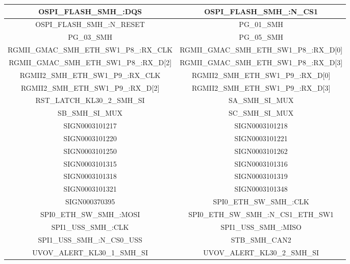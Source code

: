 \begin{center}
\begin{longtable}{|c|c|}
    OSPI\_FLASH\_SMH\_:DQS & OSPI\_FLASH\_SMH\_:N\_CS1 \\ \hline 
    OSPI\_FLASH\_SMH\_:N\_RESET & PG\_01\_SMH \\ \hline 
    PG\_03\_SMH & PG\_05\_SMH \\ \hline 
    RGMII\_GMAC\_SMH\_ETH\_SW1\_P8\_:RX\_CLK & RGMII\_GMAC\_SMH\_ETH\_SW1\_P8\_:RX\_D[0] \\ \hline 
    RGMII\_GMAC\_SMH\_ETH\_SW1\_P8\_:RX\_D[2] & RGMII\_GMAC\_SMH\_ETH\_SW1\_P8\_:RX\_D[3] \\ \hline 
    RGMII2\_SMH\_ETH\_SW1\_P9\_:RX\_CLK & RGMII2\_SMH\_ETH\_SW1\_P9\_:RX\_D[0] \\ \hline 
    RGMII2\_SMH\_ETH\_SW1\_P9\_:RX\_D[2] & RGMII2\_SMH\_ETH\_SW1\_P9\_:RX\_D[3] \\ \hline 
    RST\_LATCH\_KL30\_2\_SMH\_SI & SA\_SMH\_SI\_MUX \\ \hline 
    SB\_SMH\_SI\_MUX & SC\_SMH\_SI\_MUX \\ \hline 
    SIGN0003101217 & SIGN0003101218 \\ \hline 
    SIGN0003101220 & SIGN0003101221 \\ \hline 
    SIGN0003101250 & SIGN0003101262 \\ \hline 
    SIGN0003101315 & SIGN0003101316 \\ \hline 
    SIGN0003101318 & SIGN0003101319 \\ \hline 
    SIGN0003101321 & SIGN0003101348 \\ \hline 
    SIGN000370395 & SPI0\_ETH\_SW\_SMH\_:CLK \\ \hline 
    SPI0\_ETH\_SW\_SMH\_:MOSI & SPI0\_ETH\_SW\_SMH\_:N\_CS1\_ETH\_SW1 \\ \hline 
    SPI1\_USS\_SMH\_:CLK & SPI1\_USS\_SMH\_:MISO \\ \hline 
    SPI1\_USS\_SMH\_:N\_CS0\_USS & STB\_SMH\_CAN2 \\ \hline 
    UVOV\_ALERT\_KL30\_1\_SMH\_SI & UVOV\_ALERT\_KL30\_2\_SMH\_SI \\ \hline 
  \end{longtable} 
 \end{center}
